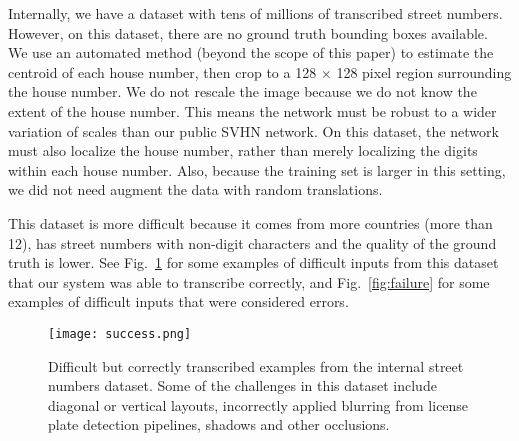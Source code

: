 \documentclass{article} \usepackage{comment}
\begin{document}
Internally, we have a dataset with tens of millions of transcribed street numbers.
However, on this dataset, there are no ground truth bounding boxes available.
We use an automated method (beyond the scope of this paper) to estimate the centroid of
each house number, then crop to a 128 $\times$ 128 pixel region surrounding the house
number. We do not rescale the image because we do not know the extent of the house number.
This means the network must be robust to a wider variation of scales than our public SVHN
network. On this dataset, the network must also localize the house number, rather than
merely localizing the digits within each house number.
Also, because the training
set is larger in this setting, we did not need augment the data with random translations.

This dataset is more difficult because it comes from more countries (more than 12),
has street numbers with non-digit characters and the quality of the ground truth is lower.
See Fig.~\ref{fig:success} for some examples of difficult inputs from this dataset that our
system was able to transcribe correctly, and Fig.~\ref{fig:failure} for some examples of
difficult inputs that were considered errors.
\begin{figure}
\vspace{-2.5mm}
\begin{centering}
\texttt{[image: success.png]}
\caption{Difficult but correctly transcribed examples from the internal street numbers dataset.
Some of the challenges in this dataset include diagonal or vertical layouts, incorrectly
applied blurring from license plate detection pipelines, shadows and other occlusions.
}
\label{fig:success}
\end{centering}
\end{figure}
\end{document}
